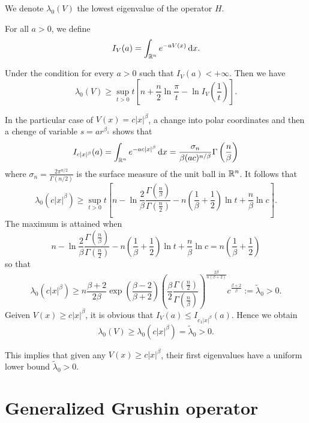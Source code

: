 We denote $\lambda_0(V)$ the lowest eigenvalue of the operator $H$.

For all $a>0$, we define
\begin{equation}
	I_V(a)=\int_{\mathbb{R}^{n}}e^{-a V(x)}\,\mathrm{d} x.
\end{equation}

\begin{theorem}
	Under the condition for every $a>0$ such that $I_V(a)<+\infty$. Then we have
	\begin{equation}
		\lambda_0(V)\ge \sup_{t>0}t\left[ n +\frac{n}{2}\ln \frac{\pi}{t}-\ln I_V\left( \frac{1}{t} \right)  \right].
	\end{equation}
\end{theorem}
In the particular case of $V(x)=c|x|^{\beta}$, a change into polar coordinates and then a chenge of variable $s=ar^{\beta _1}$ shows that 
\[
I_{c|x|^{\beta}}(a)= \int_{\mathbb{R}^{n}}e^{-ac|x|^{\beta}}\,\mathrm{d} x= \frac{\sigma _n}{\beta (a c) ^{n / \beta}}\Gamma\left( \frac{n}{\beta} \right) 
\] 
where $\displaystyle \sigma _n= \frac{2 \pi^{ n /2}}{\Gamma\left( n /2 \right) }$ is the surface measure of the unit ball in $\mathbb{R}^{n}$. It follows that 
\[
\lambda_0\left( c|x|^{\beta} \right)\ge \sup_{t>0}t\left[ n-\ln \frac{2}{\beta} \frac{\Gamma\left( \frac{n}{\beta} \right) }{\Gamma\left( \frac{n}{2} \right) }-n\left( \frac{1}{\beta}+\frac{1}{2} \right) \ln t + \frac{n}{\beta}\ln c\right].  
\]
The maximum is attained when
\[
n-\ln \frac{2}{\beta}\frac{\Gamma\left( \frac{n}{\beta} \right) }{\Gamma\left( \frac{n}{2} \right) }-n\left( \frac{1}{\beta}+\frac{1}{2} \right) \ln t + \frac{n}{\beta}\ln c =n \left( \frac{1}{\beta}+\frac{1}{2} \right) 
\] 
so that
\[
\lambda_0(c|x|^{\beta}) \ge n \frac{\beta+2}{2\beta}\exp \left( \frac{\beta-2}{\beta+2} \right) \left( \frac{\beta }{2} \frac{\Gamma\left( \frac{n}{2} \right) }{\Gamma\left( \frac{n}{\beta} \right) } \right) ^{ \frac{2\beta}{n\left( \beta+2 \right) }}c^{\frac{\beta+2}{\beta}}:= \widetilde{\lambda}_0>0.
\]
Geiven $V(x)\ge c|x|^{\beta}$, it is obvious that $I_V(a)\le I_{c_1|x|^{\beta}}(a)$. Hence we obtain
\[
\lambda_0(V)\ge \lambda_0(c|x|^{\beta})=\widetilde{\lambda}_0>0.
\]

This implies that given any $V(x)\ge c|x|^{\beta}$, their first eigenvalues have a uniform lower bound $\widetilde{\lambda}_0>0$.
\section{Generalized Grushin operator}

